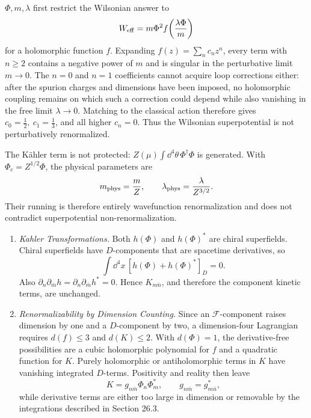 \begin{enumerate}
\begin{enumerate}
      \(\Phi,m,\lambda\) first restrict the Wilsonian answer to
      \[
        W_{\rm eff}=m\Phi^2
          f\!\left(\frac{\lambda\Phi}{m}\right)
      \]
      for a holomorphic function \(f\).  Expanding \(f(z)=\sum_nc_nz^n\),
      every term with \(n\ge2\) contains a negative power of \(m\) and is
      singular in the perturbative limit \(m\to0\).  The \(n=0\) and \(n=1\)
      coefficients cannot acquire loop corrections either: after the
      spurion charges and dimensions have been imposed, no holomorphic
      coupling remains on which such a correction could depend while also
      vanishing in the free limit \(\lambda\to0\).  Matching to the classical
      action therefore gives
      \(c_0=\tfrac12,\ c_1=\tfrac13\), and all higher \(c_n=0\).
      Thus the Wilsonian superpotential is not perturbatively renormalized.

      The Kähler term is not protected:
      \(Z(\mu)\int \dd^4\theta\,\Phi^\dagger\Phi\) is generated.  With
      \(\Phi_c=Z^{1/2}\Phi\), the physical parameters are
      \[
        m_{\rm phys}=\frac{m}{Z},\qquad
        \lambda_{\rm phys}=\frac{\lambda}{Z^{3/2}}.
      \]
      Their running is therefore entirely wavefunction renormalization and
      does not contradict superpotential non-renormalization.
  \end{enumerate}

  \begin{enumerate}
    \item \emph{Kahler Transformations.}
    Both \(h(\Phi)\) and \(h(\Phi)^*\) are chiral superfields.  Chiral
      superfields have \(D\)-components that are spacetime derivatives, so
      \[
        \int \dd^4x\,[h(\Phi)+h(\Phi)^*]_D=0 .
      \]
      Also
      \(\partial_n\partial_{\bar m}h=
        \partial_n\partial_{\bar m}h^*=0\).  Hence
      \(K_{n\bar m}\), and therefore the component kinetic terms, are
      unchanged.
    \item \emph{Renormalizability by Dimension Counting.}
    Since an \(\mathcal F\)-component raises dimension by one and a
      \(D\)-component by two, a dimension-four Lagrangian requires
      \(d(f)\le3\) and \(d(K)\le2\).  With \(d(\Phi)=1\), the derivative-free
      possibilities are a cubic holomorphic polynomial for \(f\) and a
      quadratic function for \(K\).  Purely holomorphic or antiholomorphic
      terms in \(K\) have vanishing integrated \(D\)-terms.  Positivity and
      reality then leave
      \[
        K=g_{n\bar m}\Phi_n\Phi_m^*,\qquad
        g_{n\bar m}=g_{m\bar n}^*,
      \]
      while derivative terms are either too large in dimension or removable
      by the integrations described in Section 26.3.
  \end{enumerate}


\end{enumerate}
